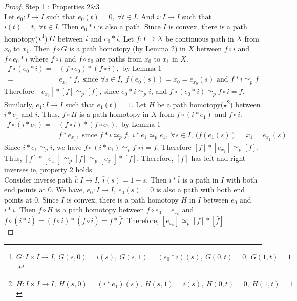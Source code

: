 \begin{proof}
	Step 1 : Properties $2 \& 3$\\

	Let $e_0 : I \to I$ such that $e_0(t) = 0,\ \forall t \in I$.
	And $i : I \to I$ such that $i(t)=t,\ \forall t \in I$.
	Then $e_0 \ast{} i$ is also a path.
	Since $I$ is convex, there is a path homotopy($\star$\footnote{$ G : I \times I \to I,\ G(s,0) = i(s),\ G(s,1) = (e_0 \ast{} i)(s),\ G(0,t) = 0,\ G(1,t) = 1$.}) $G$ between $i$ and $e_0 \ast{} i$.
	Let $f : I \to X$ be continuous path in $X$ from $x_0$ to $x_1$.
	Then $f \circ G$ is a path homotopy (by Lemma 2) in $X$ between $f \circ i$ and $f \circ e_0 \ast{} i$ where $f \circ i$ and $f \circ e_0$ are paths from $x_0$ to $x_1$ in $X$.
\begin{align*}
	f \circ (e_0 \ast i) = & (f \circ e_0)  \ast (f \circ i), \text{ by Lemma 1} \\
	= & e_{x_0} \ast f, \text{ since } \forall s \in I,\ f(e_0(s)) = x_0 = e_{x_0}(s) \text{ and }f \ast{} i \simeq_p f
\end{align*}
	Therefore $[e_{x_0}] \ast [f] \simeq_p [f]$, since $e_0 \ast i \simeq_p i$, and $f \circ (e_0 \ast i) \simeq_p f \circ i = f$. \\
	
	Similarly, $e_1 : I \to I$ such that $e_1(t) = 1$.
	Let $H$ be a path homotopy($\star$\footnote{$H : I \times I \to I,\ H(s,0)=(i \ast e_1)(s),\ H(s,1) = i(s),\ H(0,t) = 0,\ H(1,t) = 1$}) between $i \ast e_1$ and $i$.
	Thus, $f \circ H$ is a path homotopy in $X$ from $f \circ (i \ast e_1)$ and $f \circ i$.
\begin{align*}
	f \circ (i \ast e_1) = & (f \circ i) \ast (f \circ e_1), \text{ by Lemma 1} \\
	= & f \ast e_{x_1}, \text{ since } f \ast i \simeq_p f,\ i \ast e_1 \simeq_p e_1,\ \forall s \in I,\ (f(e_1(s)) = x_1 = e_{x_1}(s) 
\end{align*}
	Since $i \ast e_1 \simeq_p i$, we have $f \circ (i \ast e_1) \simeq_p f \circ i = f$.
	Therefore $[f] \ast [e_{x_1}] \simeq_p [f]$.
	Thus, $[f] \ast [e_{x_1}] \simeq_p [f] \simeq_p [e_{x_0}] \ast [f]$.
	Therefore, $[f]$ has left and right inverses ie, property 2 holds.\\


	Consider inverse path $\bar{i} : I \to I,\ \bar{i}(s) = 1-s$.
	Then $i \ast \bar{i}$ is a path in $I$ with both end points at $0$.
	We have, $e_0 : I \to I,\ e_0(s) = 0$ is also a path with both end points at $0$.
	Since $I$ is convex, there is a path homotopy $H$ in $I$ between $e_0$ and $i \ast \bar{i}$.
	Then $f \circ H$ is a path homotopy between $f \circ e_0 = e_{x_0}$ and $f \circ (i \ast \bar{i}) = (f \circ i) \ast (f \circ \bar{i}) = f \ast \bar{f}$.
	Therefore, $[e_{x_0}] \simeq_p [f] \ast [\bar{f}]$.\\



\end{proof}
